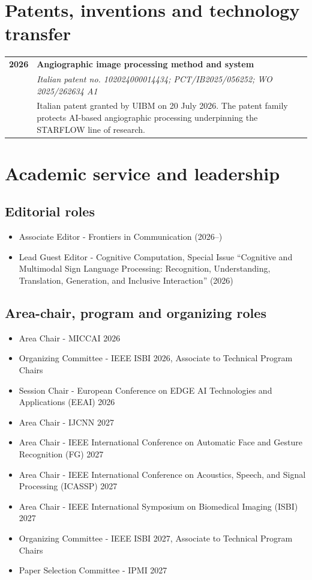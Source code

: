 \documentclass[10pt,a4paper]{article}
\makeatletter
\newcommand{\cvrole}[4]{%
\begin{tabularx}{\linewidth}{@{}>{\raggedright\arraybackslash}p{26mm}X@{}}
\textcolor{GoldAccent}{\textbf{#1}} &
\textbf{\color{Navy}#2}\\[-1pt]
& \textit{#3}\\[-1pt]
& \color{BodyGrey}#4
\end{tabularx}\vspace{3pt}}
\makeatother
\begin{document}
\section{Patents, inventions and technology transfer}
\cvrole{2026}{Angiographic image processing method and system}{Italian patent no. 102024000014434; PCT/IB2025/056252; WO 2025/262634 A1}{Italian patent granted by UIBM on 20 July 2026. The patent family protects AI-based angiographic processing underpinning the STARFLOW line of research.}

\section{Academic service and leadership}
\subsection{Editorial roles}
\begin{itemize}
\item Associate Editor - Frontiers in Communication (2026–)
\item Lead Guest Editor - Cognitive Computation, Special Issue “Cognitive and Multimodal Sign Language Processing: Recognition, Understanding, Translation, Generation, and Inclusive Interaction” (2026)
\end{itemize}
\subsection{Area-chair, program and organizing roles}
\begin{itemize}
\item Area Chair - MICCAI 2026
\item Organizing Committee - IEEE ISBI 2026, Associate to Technical Program Chairs
\item Session Chair - European Conference on EDGE AI Technologies and Applications (EEAI) 2026
\item Area Chair - IJCNN 2027
\item Area Chair - IEEE International Conference on Automatic Face and Gesture Recognition (FG) 2027
\item Area Chair - IEEE International Conference on Acoustics, Speech, and Signal Processing (ICASSP) 2027
\item Area Chair - IEEE International Symposium on Biomedical Imaging (ISBI) 2027
\item Organizing Committee - IEEE ISBI 2027, Associate to Technical Program Chairs
\item Paper Selection Committee - IPMI 2027
\end{itemize}
\end{document}
